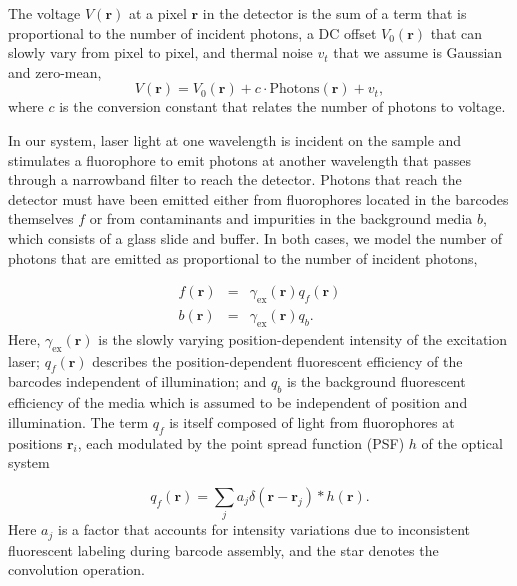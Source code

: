 The voltage $V(\mathbf{r})$ at a pixel $\mathbf{r}$ in the detector is the sum of a term that is proportional to the number of incident photons, a DC offset $V_0(\mathbf{r})$ that can slowly vary from pixel to pixel, and thermal noise $v_t$ that we assume is Gaussian and zero-mean,
\begin{equation}\label{eq:V_of_r}
V(\mathbf{r})=V_0(\mathbf{r})+c \cdot \text{Photons}(\mathbf{r}) +v_t,
\end{equation}
where $c$ is the conversion constant that relates the number of photons to voltage. 


In our system, laser light at one wavelength is incident on the sample and stimulates a fluorophore to emit photons at another wavelength that passes through a narrowband filter to reach the detector. Photons that reach the detector must have been emitted either from fluorophores located  in the barcodes themselves $f$ or from contaminants and impurities in the background media $b$, which consists of a glass slide and buffer.  In both cases, we model the number of photons that are emitted as proportional to the number of incident photons, 

\begin{eqnarray}\label{eq:f_and_b}
f(\mathbf{r})&=&\gamma_{\text{ex}}(\mathbf{r}) q_f(\mathbf{r})\\
b(\mathbf{r})&=&\gamma_{\text{ex}}(\mathbf{r}) q_b.
\end{eqnarray}
Here, $\gamma_{\text{ex}}(\mathbf{r})$ is the slowly varying position-dependent intensity of the excitation laser;  $q_f(\mathbf{r})$ describes the position-dependent fluorescent efficiency of the barcodes independent of illumination; and $q_b$ is the background fluorescent efficiency of the media which is assumed to be independent of position and illumination. The term $q_f$ is itself composed of light from fluorophores at positions $\mathbf{r}_i$, each modulated by the point spread function (PSF) $h$ of the optical system

\begin{equation} \label{eq:withPSF}
q_f(\mathbf{r})=\sum_j a_j \delta(\mathbf{r}-\mathbf{r}_j) * h(\mathbf{r}).
\end{equation}
Here $a_j$ is a factor that accounts for intensity variations due to inconsistent fluorescent labeling  during barcode assembly, and the star denotes the convolution operation. 

